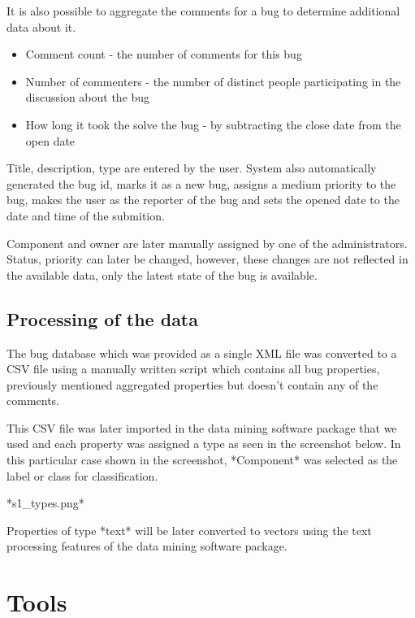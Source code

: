 It is also possible to aggregate the comments for a bug to determine additional data about it.

\begin{itemize}
\item Comment count - the number of comments for this bug
\item Number of commenters - the number of distinct people participating in the discussion about the bug
\item How long it took the solve the bug - by subtracting the close date from the open date
\end{itemize}

Title, description, type are entered by the user. System also automatically generated the bug id, marks it as a new bug, assigns a medium priority to the bug, makes the user as the reporter of the bug and sets the opened date to the date and time of the submition.

Component and owner are later manually assigned by one of the administrators. Status, priority can later be changed, however, these changes are not reflected in the available data, only the latest state of the bug is available.

\subsection*{Processing of the data} %

The bug database which was provided as a single XML file was converted to a CSV file using a manually written script which contains all bug properties, previously mentioned aggregated properties but doesn't contain any of the comments.

This CSV file was later imported in the data mining software package that we used and each property was assigned a type as seen in the screenshot below. In this particular case shown in the screenshot, *Component* was selected as the label or class for classification.

*s1\_types.png*

Properties of type *text* will be later converted to vectors using the text processing features of the data mining software package.



\section{Tools} %
\label{sub:Tools}

